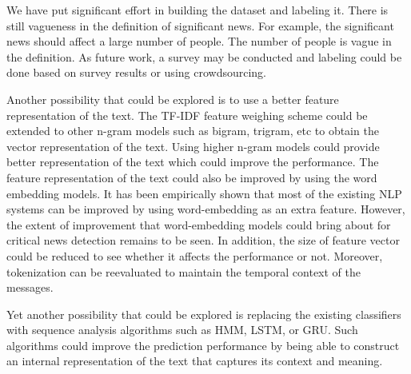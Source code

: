We have put significant effort in building the dataset and labeling it. There is still vagueness in the definition of significant news. For example, the significant news should affect a large number of people. The number of people is vague in the definition. As future work, a survey may be conducted and labeling could be done based on survey results or using crowdsourcing. 

Another possibility that could be explored is to use a better feature representation of the text. The TF-IDF feature weighing scheme could be extended to other n-gram models such as bigram, trigram, etc to obtain the vector representation of the text. Using higher n-gram models could provide better representation of the text which could improve the performance. The feature representation of the text could also be improved by using the word embedding models. It has been empirically shown that most of the existing NLP systems can be improved by using word-embedding as an extra feature\cite{turian2010word}. However, the extent of improvement that word-embedding models could bring about for critical news detection remains to be seen. In addition, the size of feature vector could be reduced to see whether it affects the performance or not. Moreover, tokenization can be reevaluated to maintain the temporal context of the messages. 

Yet another possibility that could be explored is replacing the existing classifiers with sequence analysis algorithms such as HMM\cite{baum1966statistical}, LSTM\cite{hochreiter1997long}, or GRU\cite{cho2014learning}. Such algorithms could improve the prediction performance by being able to construct an internal representation of the text that captures its context and meaning.
